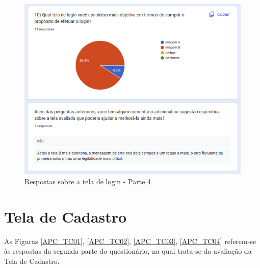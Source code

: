 \begin{figure}[!h]
	\begin{center}
	    \includegraphics[scale=0.7]{figs/Answers/Professionals/07.png}
	\end{center}
	\caption{\label{APC_TL04}Respostas sobre a tela de login - Parte 4}
\end{figure}

\newpage

\section{Tela de Cadastro}

As Figuras \ref{APC_TC01}, \ref{APC_TC02}, \ref{APC_TC03}, \ref{APC_TC04} referem-se às respostas da segunda parte do questionário, na qual trata-se da avaliação da Tela de Cadastro.

